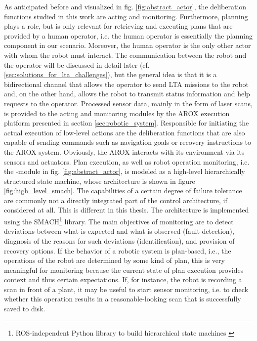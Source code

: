 \documentclass[english, master, utf8]{base/thesis_KBS}
\newcommand{\code}{\collectverb{\codebox}}
\begin{document}
\noindent
As anticipated before and visualized in fig. \ref{fig:abstract_actor}, the deliberation functions studied in this work are acting and monitoring. Furthermore, planning plays a role,
but is only relevant for retrieving and executing plans that are provided by a human operator, i.e. the human operator is essentially the planning component in our scenario.
Moreover, the human operator is the only other actor with whom the robot must interact. The communication between the robot and the operator will be discussed in detail later (cf.
\ref{sec:solutions_for_lta_challenges}), but the general idea is that it is a bidirectional channel that allows the operator to send LTA missions to the robot and, on the
other hand, allows the robot to transmit status information and help requests to the operator. Processed sensor data, mainly in the form of laser scans, is provided to the
acting and monitoring modules by the AROX execution platform presented in section \ref{sec:robotic_system}. Responsible for initiating the actual execution of low-level actions
are the deliberation functions that are also capable of sending commands such as \code{move_base_flex} navigation goals or recovery instructions to the AROX system.
Obviously, the AROX interacts with its environment via its sensors and actuators.\newline
Plan execution, as well as robot operation monitoring, i.e. the -module in fig. \ref{fig:abstract_actor}, is modeled as a high-level hierarchically
structured state machine, whose architecture is shown in figure \ref{fig:high_level_smach}. The capabilities of a certain degree of failure tolerance are commonly not a directly
integrated part of the control architecture, if considered at all. \cite{Khalastchi:2018} This is different in this thesis.
The architecture is implemented using the SMACH\footnote{ROS-independent Python
library to build hierarchical state machines \cite{smach}} library. The main objectives of monitoring are to detect deviations between what is expected and what is observed
(fault detection), diagnosis of the reasons for such deviations (identification), and provision of recovery options. \cite{Ingrand:2017}
If the behavior of a robotic system is plan-based, i.e., the operations of the robot are determined by some kind of plan, this is very meaningful for monitoring because the current
state of plan execution provides context and thus certain expectations. \cite{Khalastchi:2018} If, for instance, the robot is recording a scan in front of a plant, it may be useful
to start sensor monitoring, i.e. to check whether this operation results in a reasonable-looking scan that is successfully saved to disk.
\end{document}
